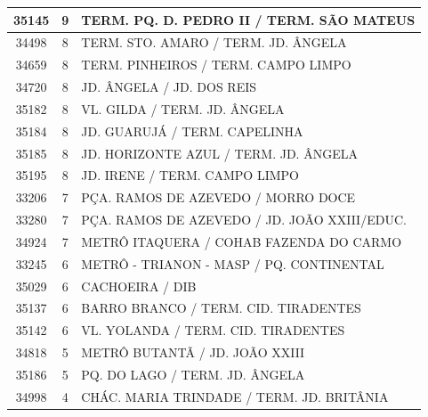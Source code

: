 \documentclass[
	12pt,				%
	oneside,			%
	a4paper,			%
	english,			%
	brazil				%
	]{abntex2ppgsi}
\begin{document}
{{\begin{apendicesenv}
\begin{longtable}{c|c|p{7cm}}
    35145 & 9     & TERM. PQ. D. PEDRO II / TERM. SÃO MATEUS \\
\hline

    34498 & 8     & TERM. STO. AMARO / TERM. JD. ÂNGELA \\
\hline

    34659 & 8     & TERM. PINHEIROS / TERM. CAMPO LIMPO \\
\hline

    34720 & 8     & JD. ÂNGELA / JD. DOS REIS \\
\hline

    35182 & 8     & VL. GILDA / TERM. JD. ÂNGELA \\
\hline

    35184 & 8     & JD. GUARUJÁ / TERM. CAPELINHA \\
\hline

    35185 & 8     & JD. HORIZONTE AZUL / TERM. JD. ÂNGELA \\
\hline

    35195 & 8     & JD. IRENE / TERM. CAMPO LIMPO \\
\hline

    33206 & 7     & PÇA. RAMOS DE AZEVEDO / MORRO DOCE \\
\hline

    33280 & 7     & PÇA. RAMOS DE AZEVEDO / JD. JOÃO XXIII/EDUC. \\
\hline

    34924 & 7     & METRÔ ITAQUERA / COHAB FAZENDA DO CARMO \\
\hline

    33245 & 6     & METRÔ - TRIANON - MASP  / PQ. CONTINENTAL \\
\hline

    35029 & 6     & CACHOEIRA / DIB \\
\hline

    35137 & 6     & BARRO BRANCO / TERM. CID. TIRADENTES \\
\hline

    35142 & 6     & VL. YOLANDA / TERM. CID. TIRADENTES \\
\hline

    34818 & 5     & METRÔ BUTANTÃ / JD. JOÃO XXIII \\
\hline

    35186 & 5     & PQ. DO LAGO / TERM. JD. ÂNGELA \\
\hline

    34998 & 4     & CHÁC. MARIA TRINDADE / TERM. JD. BRITÂNIA \\
\hline


\end{longtable}
\end{apendicesenv}}}
\end{document}

